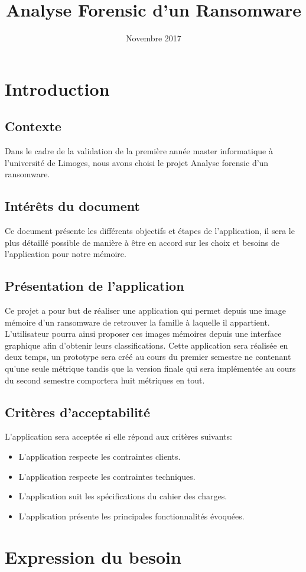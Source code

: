 \documentclass[a4paper, 12pt, twoside]{article}
\author{}
\title{Analyse Forensic d'un Ransomware}
\date{Novembre 2017}
\begin{document}
\pagedegarde
\tableofcontents
\newpage
\section{Introduction}
\subsection{Contexte}
Dans le cadre de la validation de la première année master informatique à l’université de Limoges, nous avons choisi le projet Analyse forensic d’un ransomware.
\subsection{Intérêts du document}
Ce document présente les différents objectifs et étapes de l'application, il sera le plus détaillé possible de manière à être en accord sur les choix et besoins de l'application pour notre mémoire.
\subsection{Présentation de l'application}
Ce projet a pour but de réaliser une application qui permet depuis une image mémoire d’un ransomware de retrouver la famille à laquelle il appartient. L'utilisateur  pourra ainsi proposer ces images mémoires depuis une interface graphique afin d'obtenir leurs classifications. Cette application sera réalisée en deux temps, un prototype sera créé au cours du premier semestre ne contenant qu’une seule métrique tandis que la version finale qui sera implémentée au cours du second semestre comportera huit métriques en tout.
\subsection{Critères d'acceptabilité}
L'application sera acceptée si elle répond aux critères suivants:
\begin{itemize}
\item L'application respecte les contraintes clients.
\item L'application respecte les contraintes techniques.
\item L'application suit les spécifications du cahier des charges.
\item L'application présente les principales fonctionnalités évoquées.
\end{itemize}
\section{Expression du besoin}
\end{document}

